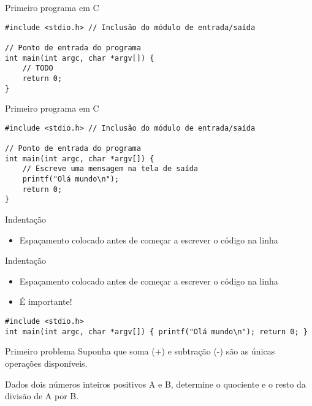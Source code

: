 \documentclass[t, aspectratio=169]{beamer}
\begin{document}
\begin{frame}[label={sec:org98c95d3},fragile]{Primeiro programa em C}
 \begin{verbatim}
#include <stdio.h> // Inclusão do módulo de entrada/saída

// Ponto de entrada do programa
int main(int argc, char *argv[]) {
    // TODO
    return 0;
}
\end{verbatim}
\end{frame}

\begin{frame}[label={sec:orgd682682},fragile]{Primeiro programa em C}
 \begin{verbatim}
#include <stdio.h> // Inclusão do módulo de entrada/saída

// Ponto de entrada do programa
int main(int argc, char *argv[]) {
    // Escreve uma mensagem na tela de saída
    printf("Olá mundo\n");
    return 0;
}
\end{verbatim}
\end{frame}

\begin{frame}[label={sec:org15314b4}]{Indentação}
\begin{itemize}
\item Espaçamento colocado antes de começar a escrever o código na linha
\end{itemize}
\end{frame}

\begin{frame}[label={sec:org7fcd2c5},fragile]{Indentação}
 \begin{itemize}
\item Espaçamento colocado antes de começar a escrever o código na linha
\item É importante!
\end{itemize}

\begin{verbatim}
#include <stdio.h>
int main(int argc, char *argv[]) { printf("Olá mundo\n"); return 0; }
\end{verbatim}
\end{frame}

\begin{frame}[label={sec:org0596c25}]{Primeiro problema}
Suponha que soma (+) e subtração (-) são as únicas operações disponíveis.

Dados dois números inteiros positivos \alert{A} e \alert{B}, determine o \alert{quociente} e o \alert{resto}
da divisão de \alert{A} por \alert{B.}
\end{frame}
\end{document}
